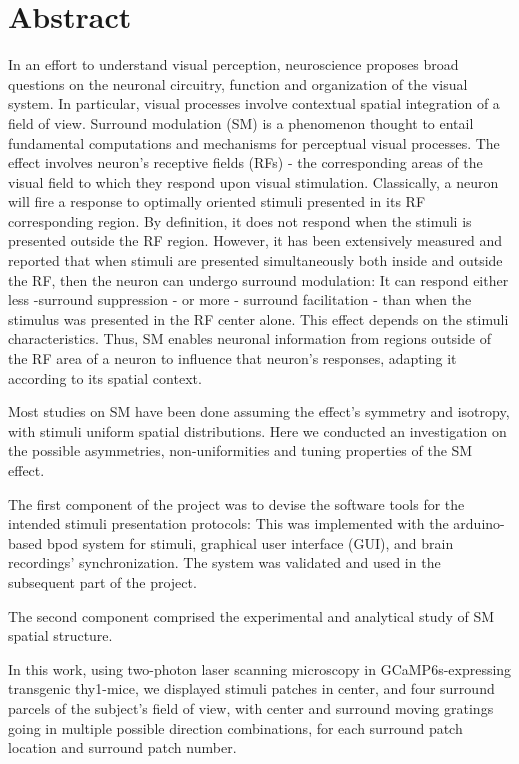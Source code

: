 
\section*{Abstract}
In an effort to understand visual perception, neuroscience proposes broad questions on the neuronal circuitry, function and organization of the visual system. In particular, visual processes involve contextual spatial integration of a field of view. Surround modulation (SM) is a phenomenon thought to entail fundamental computations and mechanisms for perceptual visual processes. The effect involves neuron's receptive fields (RFs) - the corresponding areas of the visual field to which they respond upon visual stimulation. Classically, a neuron will fire a response to optimally oriented stimuli presented in its RF corresponding region. By definition, it does not respond when the stimuli is presented outside the RF region. However, it has been extensively measured and reported that when stimuli are presented simultaneously both inside and outside the RF, then the neuron can undergo surround modulation: It can respond either less -surround suppression - or more - surround facilitation - than when the stimulus was presented in the RF center alone. This effect depends on the stimuli characteristics. Thus, SM enables neuronal information from regions outside of the RF area of a neuron to influence that neuron's responses, adapting it according to its spatial context.

Most studies on SM have been done assuming the effect's symmetry and isotropy, with stimuli uniform spatial distributions. Here we conducted an investigation on the possible asymmetries, non-uniformities and tuning properties of the SM effect.

The first component of the project was to devise the software tools for the intended stimuli presentation protocols: This was implemented with the arduino-based bpod system for stimuli, graphical user interface (GUI), and brain recordings' synchronization. The system was validated and used in the subsequent part of the project.

The second component comprised the experimental and analytical study of SM spatial structure.

In this work, using two-photon laser scanning microscopy in GCaMP6s-expressing transgenic thy1-mice, we displayed stimuli patches in center, and four surround parcels of the subject's field of view, with center and surround moving gratings going in multiple possible direction combinations, for each surround patch location and surround patch number.

